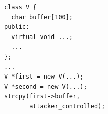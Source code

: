 \documentclass[tikz]{standalone}
\begin{document}
\begin{lrbox}{\heapAdjacentCode}
\lstset{language=C++,style=small}
\begin{lstlisting}
class V {
  char buffer[100];
public:
  virtual void ...;
  ...
};
...
V *first = new V(...);
V *second = new V(...);
strcpy(first->buffer,
       attacker_controlled);
\end{lstlisting}
\end{lrbox}



\end{document}
